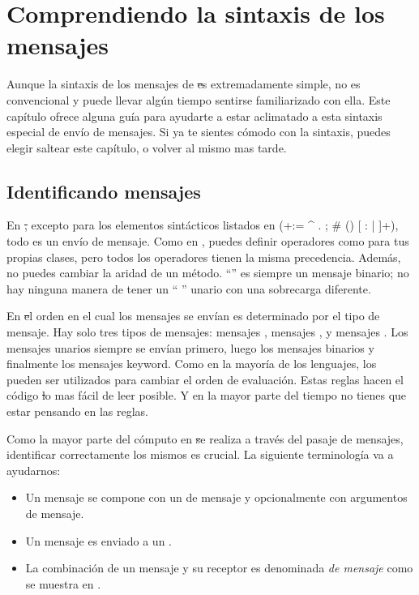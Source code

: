 \documentclass[a4paper,10pt,twoside]{book}
\begin{document}
	\renewcommand{\nnbb}[2]{} %
	\sloppy
\fi
\chapter{Comprendiendo la sintaxis de los mensajes}

Aunque la sintaxis de los mensajes de \st es extremadamente simple, no es convencional y puede llevar alg\'un tiempo sentirse familiarizado con ella.
Este cap\'itulo ofrece alguna gu\'ia para ayudarte a estar aclimatado a esta sintaxis especial de env\'io de mensajes.
Si ya te sientes c\'omodo con la sintaxis, puedes elegir saltear este cap\'itulo, o volver al mismo mas tarde.

\section{Identificando mensajes}

En \st, excepto para los elementos sint\'acticos listados en  (\ct+:= ^ . ; # () {} [ : | ]+), todo es un env\'io de mensaje.
Como en , puedes definir operadores como \ct{+} para tus propias clases, pero todos los operadores tienen la misma precedencia.
Adem\'as, no puedes cambiar la aridad de un m\'etodo. ``\ct{-}'' es siempre un mensaje binario; no hay ninguna manera de tener un `` \ct{-}'' unario con una sobrecarga diferente.

En \st el orden en el cual los mensajes se env\'ian es determinado por el tipo de mensaje. Hay solo tres tipos de mensajes: mensajes , mensajes , y mensajes . Los mensajes unarios siempre se env\'ian primero, luego los mensajes binarios y finalmente los mensajes keyword. Como en la mayor\'ia de los lenguajes, los  pueden ser utilizados para cambiar el orden de evaluaci\'on. Estas reglas hacen el c\'odigo \st lo mas f\'acil de leer posible. Y en la mayor parte del tiempo no tienes que estar pensando en las reglas.

Como la mayor parte del c\'omputo en \st se realiza a trav\'es del pasaje de mensajes, identificar correctamente los mismos es crucial. La siguiente terminolog\'ia va a ayudarnos:

\begin{itemize}
  \item Un mensaje se compone con un  de mensaje y opcionalmente con argumentos de mensaje.
  \item Un mensaje es enviado a un .
  \item La combinaci\'on de un mensaje y su receptor es denominada  \emph{de mensaje} como se muestra en .
\end{itemize}
\end{document}
